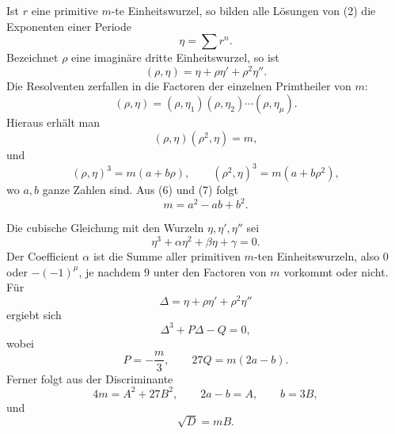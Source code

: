 \documentclass[11pt]{article}
\begin{document}
Ist $r$ eine primitive $m$-te Einheitswurzel, so bilden alle Lösungen von (2) die Exponenten einer Periode
\begin{equation}
   \eta=\sum r^n .
   \tag{3}
\end{equation}
Bezeichnet $\rho$ eine imaginäre dritte Einheitswurzel, so ist
\begin{equation}
   (\rho,\eta)=\eta+\rho\eta'+\rho^2\eta'' .
   \tag{4}
\end{equation}
Die Resolventen zerfallen in die Factoren der einzelnen Primtheiler von $m$:
\begin{equation}
   (\rho,\eta)=(\rho,\eta_1)(\rho,\eta_2)\cdots(\rho,\eta_\mu).
   \tag{5}
\end{equation}
Hieraus erhält man
\begin{equation}
   (\rho,\eta)(\rho^2,\eta)=m,
   \tag{6}
\end{equation}
und
\begin{equation}
   (\rho,\eta)^3=m(a+b\rho),
   \qquad
   (\rho^2,\eta)^3=m(a+b\rho^2),
   \tag{7}
\end{equation}
wo $a,b$ ganze Zahlen sind. Aus (6) und (7) folgt
\begin{equation}
   m=a^2-ab+b^2 .
   \tag{8}
\end{equation}

Die cubische Gleichung mit den Wurzeln $\eta,\eta',\eta''$ sei
\begin{equation}
   \eta^3+\alpha\eta^2+\beta\eta+\gamma=0.
   \tag{9}
\end{equation}
Der Coefficient $\alpha$ ist die Summe aller primitiven $m$-ten Einheitswurzeln, also $0$ oder $-(-1)^\mu$, je nachdem $9$ unter den Factoren von $m$ vorkommt oder nicht. Für
\[
   \Delta=\eta+\rho\eta'+\rho^2\eta''
\]
ergiebt sich
\begin{equation}
   \Delta^3+P\Delta-Q=0,
   \tag{10}
\end{equation}
wobei
\begin{equation}
   P=-\frac{m}{3},
   \qquad 27Q=m(2a-b).
   \tag{11}
\end{equation}
Ferner folgt aus der Discriminante
\begin{equation}
   4m=A^2+27B^2,
   \qquad 2a-b=A,
   \qquad b=3B,
   \tag{12}
\end{equation}
und
\begin{equation}
   \sqrt D=mB.
   \tag{13}
\end{equation}
\end{document}
